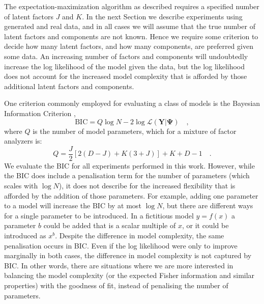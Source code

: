 \documentclass[twocolumn]{aastex62}
\newcommand{\vect}[1]{\boldsymbol{\mathbf{#1}}}
\renewcommand{\vec}[1]{\vect{#1}}
\newcommand{\data}{\textbf{Y}}
\newcommand{\NumDimensions}{D}
\newcommand{\NumLatentFactors}{J}
\newcommand{\NumComponents}{K}
\begin{document}
The expectation-maximization algorithm as described requires a specified 
number of latent factors $\NumLatentFactors$ and $\NumComponents$. In the next 
Section we describe experiments using generated and real data, and in all cases we will
assume that the true number of latent factors and components are not known. 
Hence we require some criterion to decide how many latent factors, and how many
components, are preferred given some data. An increasing number of factors
and components will undoubtedly increase the log likelihood of the model given
the data, but the log likelihood does not account for the increased model 
complexity that is afforded by those additional latent factors and components.


One criterion commonly employed for evaluating a class of models is the 
Bayesian Information Criterion \citep[BIC;][]{Schwarz:1978}, 
\begin{equation}
	\textrm{BIC} = Q\log{N} - 2\log\mathcal{L}\left(\data|\vec\Psi\right) \quad , \label{eq:bic}
\end{equation} 
\noindent{}where $Q$ is the number of model parameters, which for a mixture of
factor analyzers is:
\begin{equation}
	Q = \frac{\NumLatentFactors}{2}\left[2\left(\NumDimensions - \NumLatentFactors\right) + \NumComponents\left(3 + \NumLatentFactors\right)\right] + \NumComponents + \NumDimensions - 1 \quad .
\end{equation}
\noindent{}We evaluate the BIC for all experiments performed in this work.
However, while the BIC does include a penalisation term for the number of
parameters (which scales with $\log{N}$), it does not describe for the
increased flexibility that is afforded by the addition of those parameters.
For example, adding one parameter
to a model will increase the BIC by at most $\log{N}$, but there are different
ways for a single parameter to be introduced. In a fictitious model $y=f(x)$
a parameter $b$ could be added that is a scalar multiple of $x$, or it could be
introduced as $x^b$. Despite the difference in model complexity, the same
penalisation occurs in BIC. Even if the log likelihood were only to improve
marginally in both cases, the difference in model complexity is not captured
by BIC. In other words, there are situations where we are more interested in
balancing the model complexity (or the expected Fisher information and similar
properties) with the goodness of fit, instead of penalising the number of 
parameters.
\end{document}
